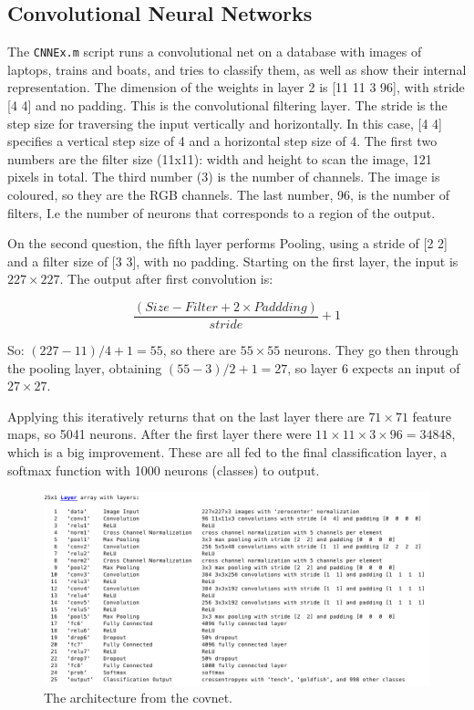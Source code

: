 \documentclass[a4paper, 10pt]{article}
\begin{document}
  \subsection{Convolutional Neural Networks}
  The \texttt{CNNEx.m} script runs a convolutional net on a database with images
  of laptops, trains and boats, and tries to classify them, as well as show their
  internal representation. The dimension of the weights in layer 2 is [11 11 3 
  96],  with stride [4 4] and no padding. This is the convolutional filtering 
  layer.  The stride is the step size for 
  traversing the input vertically and horizontally. In this case, [4 4] 
  specifies a vertical step size of 4 and a horizontal step size of 4.
  The first two numbers are the filter size (11x11):  width and height 
  to scan the image, 121 pixels in total. The third number (3) is the number 
  of channels. The image is coloured, so they are the RGB channels. 
  The last number, 96, is the number of filters, I.e  the number of neurons 
  that corresponds to a region of the output.  

  On the second question, the fifth layer performs Pooling, using a stride of
  [2 2] and a filter size of  [3 3], with no padding. Starting on the first 
  layer, the input is $227 \times 227$.
  The output after first convolution is: 
  
  $$\frac{(Size - Filter + 2 \times Paddding)}{stride} + 1$$
  
  So: $(227 - 11) / 4 + 1 = 55$, so there are $55 \times 55$ 
  neurons. They go then through the pooling layer, 
  obtaining $(55 - 3)/2 + 1 = 27$, so layer 6 expects an input of $27 \times 27$.

  Applying this iteratively returns that on the last layer there are
  $71 \times 71$ feature maps, so 5041 neurons. After the first layer there 
  were $11 \times 11 \times 3 \times 96 =34848$, which is a big improvement. These
  are all fed to the final classification layer, a softmax function with 1000 neurons
  (classes) to output.

  \begin{figure}[b]
    \centering
    \includegraphics[width=0.6\linewidth]{./lab4/cnn_layers.png}
    \caption{The architecture from the covnet.}
  \end{figure}
\end{document}
